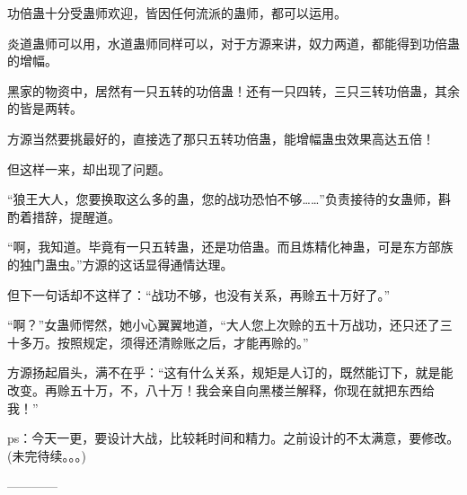 \begin{this_body}
功倍蛊十分受蛊师欢迎，皆因任何流派的蛊师，都可以运用。

炎道蛊师可以用，水道蛊师同样可以，对于方源来讲，奴力两道，都能得到功倍蛊的增幅。

黑家的物资中，居然有一只五转的功倍蛊！还有一只四转，三只三转功倍蛊，其余的皆是两转。

方源当然要挑最好的，直接选了那只五转功倍蛊，能增幅蛊虫效果高达五倍！

但这样一来，却出现了问题。

“狼王大人，您要换取这么多的蛊，您的战功恐怕不够……”负责接待的女蛊师，斟酌着措辞，提醒道。

“啊，我知道。毕竟有一只五转蛊，还是功倍蛊。而且炼精化神蛊，可是东方部族的独门蛊虫。”方源的这话显得通情达理。

但下一句话却不这样了：“战功不够，也没有关系，再赊五十万好了。”

“啊？”女蛊师愕然，她小心翼翼地道，“大人您上次赊的五十万战功，还只还了三十多万。按照规定，须得还清赊账之后，才能再赊的。”

方源扬起眉头，满不在乎：“这有什么关系，规矩是人订的，既然能订下，就是能改变。再赊五十万，不，八十万！我会亲自向黑楼兰解释，你现在就把东西给我！”

ps：今天一更，要设计大战，比较耗时间和精力。之前设计的不太满意，要修改。(未完待续。。。)

------------

\end{this_body}

